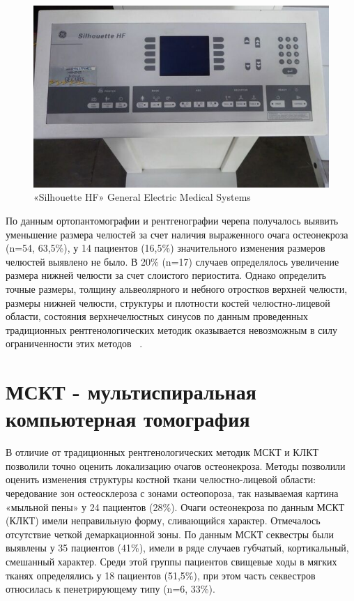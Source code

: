 \documentclass[11pt]{article}
\begin{document}
	\begin{figure}[H]
	\centering
	\includegraphics[width=\textwidth]{hf3}
	\caption{«Silhouette HF» General Electric Medical Systems}
	\label{fig:hf3}
	\end{figure}

По данным ортопантомографии и рентгенографии черепа получалось выявить уменьшение размера челюстей за счет наличия выраженного очага остеонекроза (n=54, 63,5\%), у 14 пациентов (16,5\%) значительного изменения размеров челюстей выявлено не было. В 20\% (n=17) случаев определялось увеличение размера нижней челюсти за счет слоистого периостита. Однако определить точные размеры, толщину альвеолярного и небного отростков верхней челюсти, размеры нижней челюсти, структуры и плотности костей челюстно-лицевой области, состояния верхнечелюстных синусов по данным проведенных традиционных рентгенологических методик оказывается невозможным в силу ограниченности этих методов ~\cite{rejr}. 

	\section{ МСКТ - мультиспиральная компьютерная томография}
	В отличие от традиционных рентгенологических методик МСКТ и КЛКТ позволили точно оценить локализацию очагов остеонекроза. 
	Методы позволили оценить изменения	структуры костной ткани челюстно-лицевой области: чередование зон остеосклероза с зонами остеопороза, так называемая картина «мыльной пены» у 24 пациентов (28\%). Очаги остеонекроза по данным МСКТ (КЛКТ) имели неправильную форму, сливающийся характер. Отмечалось отсутствие четкой демаркационной зоны. По  данным  МСКТ  секвестры   были выявлены  у  35  пациентов (41\%), имели в ряде случаев губчатый, кортикальный, смешанный характер. Среди этой группы пациентов свищевые ходы в мягких тканях определялись у 18	пациентов (51,5\%), при этом часть секвестров	относилась к пенетрирующему типу (n=6, 33\%).
	
\end{document}
